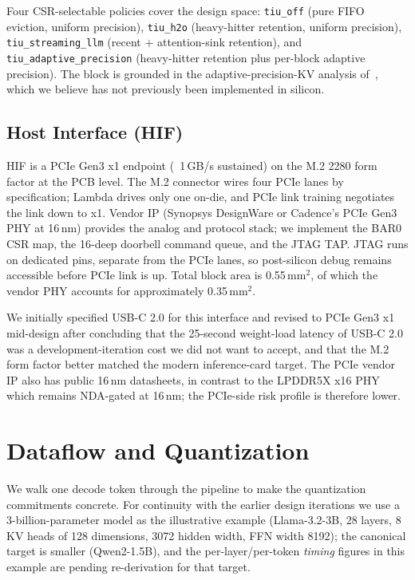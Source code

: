 \documentclass[conference]{IEEEtran}
\begin{document}
Four CSR-selectable policies cover the design space: \texttt{tiu\_off} (pure FIFO eviction, uniform precision), \texttt{tiu\_h2o} (heavy-hitter retention, uniform precision), \texttt{tiu\_streaming\_llm} (recent + attention-sink retention), and \texttt{tiu\_adaptive\_precision} (heavy-hitter retention plus per-block adaptive precision). The block is grounded in the adaptive-precision-KV analysis of~\cite{adaptive_kv}, which we believe has not previously been implemented in silicon.

\subsection{Host Interface (HIF)}

HIF is a PCIe Gen3 x1 endpoint (~1\,GB/s sustained) on the M.2 2280 form factor at the PCB level. The M.2 connector wires four PCIe lanes by specification; Lambda drives only one on-die, and PCIe link training negotiates the link down to x1. Vendor IP (Synopsys DesignWare or Cadence's PCIe Gen3 PHY at 16\,nm) provides the analog and protocol stack; we implement the BAR0 CSR map, the 16-deep doorbell command queue, and the JTAG TAP. JTAG runs on dedicated pins, separate from the PCIe lanes, so post-silicon debug remains accessible before PCIe link is up. Total block area is 0.55\,mm$^2$, of which the vendor PHY accounts for approximately 0.35\,mm$^2$.

We initially specified USB-C 2.0 for this interface and revised to PCIe Gen3 x1 mid-design after concluding that the 25-second weight-load latency of USB-C 2.0 was a development-iteration cost we did not want to accept, and that the M.2 form factor better matched the modern inference-card target. The PCIe vendor IP also has public 16\,nm datasheets, in contrast to the LPDDR5X x16 PHY which remains NDA-gated at 16\,nm; the PCIe-side risk profile is therefore lower.

\section{Dataflow and Quantization}
\label{sec:dataflow}

We walk one decode token through the pipeline to make the quantization commitments concrete. For continuity with the earlier design iterations we use a 3-billion-parameter model as the illustrative example (Llama-3.2-3B, 28 layers, 8 KV heads of 128 dimensions, 3072 hidden width, FFN width 8192); the canonical target is smaller (Qwen2-1.5B), and the per-layer/per-token \emph{timing} figures in this example are pending re-derivation for that target.
\end{document}
